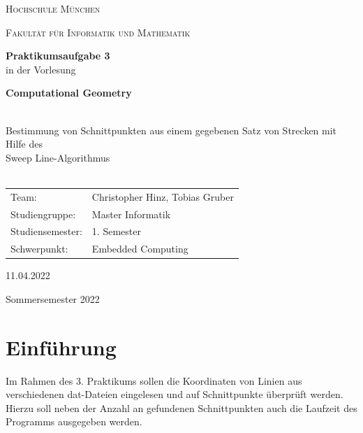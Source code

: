 \documentclass[12pt]{scrartcl}
\begin{document}
\begin{titlepage}
    \vfill
	\centering
    \vspace{1.5cm}

	{\scshape\LARGE Hochschule München \par}
    {\scshape\Large Fakultät für Informatik und Mathematik\par}
	\vspace{1.5cm}




    \vfill
    {\LARGE\bfseries Praktikumsaufgabe 3 \\}
    \vspace{0.5cm}
	{in der Vorlesung\\}
    \vspace{0.5cm}
    {\LARGE\bfseries Computational Geometry\\~\\ \par}
	{\LARGE Bestimmung von Schnittpunkten aus einem gegebenen Satz von Strecken mit Hilfe des \\Sweep Line-Algorithmus\\~\\ \par}
	\vfill
    \vfill


    \begin{tabular}{ll}
    \normalsize
    Team:  & Christopher Hinz, Tobias Gruber\\
    Studiengruppe: & Master Informatik\\
    Studiensemester: & 1. Semester\\
    Schwerpunkt: & Embedded Computing\\
    \end{tabular}
    \vspace{1.5cm}

    11.04.2022

    \vspace{0.5cm}

    Sommersemester 2022

	\vfill

\end{titlepage}

\newpage

\thispagestyle{empty}
\tableofcontents
\newpage

\section{Einführung}
Im Rahmen des 3. Praktikums sollen die Koordinaten von Linien aus verschiedenen dat-Dateien eingelesen und auf Schnittpunkte überprüft werden.
Hierzu soll neben der Anzahl an gefundenen Schnittpunkten auch die Laufzeit des Programms ausgegeben werden.
\end{document}
